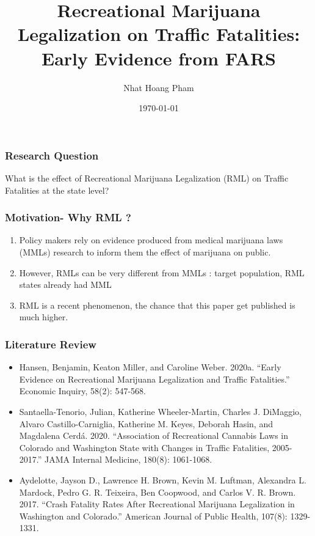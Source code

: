 \documentclass{beamer}
\title{Recreational Marijuana Legalization on Traffic Fatalities: Early Evidence from FARS}
\author{Nhat Hoang Pham	}
\institute{UC Denver}
\date{\today}
\begin{document}
\frame{\titlepage}

\begin{frame} %
\frametitle{Research Question}
	What is the effect of Recreational Marijuana Legalization (RML)  on Traffic Fatalities at the state level? 
\end{frame} 
\begin{frame} %
\frametitle{Motivation- Why RML ?}
	\begin{enumerate}
		\item
	Policy makers rely on evidence produced from medical marijuana laws (MMLs) research to inform them the effect of marijuana on public. 
		\item 
	However, RMLs can be very different from MMLs : target population, RML states already had MML \pause
		\item
	RML is a recent phenomenon, the chance that this paper get published is much higher. 
	\end{enumerate} 
\end{frame} 

\begin{frame} %
\frametitle{Literature Review}
	\begin{itemize}
	
		\item 
		Hansen, Benjamin, Keaton Miller, and Caroline Weber. 2020a. “Early Evidence on Recreational Marijuana Legalization and Traffic Fatalities.” Economic Inquiry, 58(2): 547-568. \pause
		
		\item
		Santaella-Tenorio, Julian, Katherine Wheeler-Martin, Charles J. DiMaggio, Alvaro Castillo-Carniglia, Katherine M. Keyes, Deborah Hasin, and Magdalena Cerdá. 2020. “Association of Recreational Cannabis Laws in Colorado and Washington State with Changes in Traffic Fatalities, 2005-2017.” JAMA Internal Medicine, 180(8): 1061-1068. \pause
		
		\item
		Aydelotte, Jayson D., Lawrence H. Brown, Kevin M. Luftman, Alexandra L. Mardock, Pedro G. R. Teixeira, Ben Coopwood, and Carlos V. R. Brown. 2017. “Crash Fatality Rates After Recreational Marijuana Legalization in Washington and Colorado.” American Journal of Public Health, 107(8): 1329- 1331. \pause
		
	\end{itemize}
\end{frame} 
\end{document}
